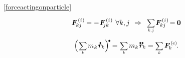 \vspace{-0.2em}
~\eqref{forceactingonparticle}

\nopagebreak\vspace{-0.3em}
\begin{equation}\label{actionreactionprinciple.fordiscretepoints}
\bm{F}^{\smthinternal}_{\hspace{-0.16ex}kj} = - \hspace{.12ex} \bm{F}^{\smthinternal}_{\hspace{-0.4ex}jk}
\hspace{.44em} \forall k,j
\hspace{.4em} \Rightarrow \hspace{.5em}
\scalebox{.8}{$ \displaystyle \sum_{\smash{k,\hspace{.1ex}j}} $} \hspace{.2ex}
\bm{F}^{\smthinternal}_{\hspace{-0.16ex}kj} \hspace{-0.2ex}
= \hspace{-0.1ex} \zerovector
\end{equation}


\vspace{-0.8em}\noindent
{}

\nopagebreak\vspace{-0.3em}
\begin{equation}\label{balanceoftranslationalmomentum.discretepoints}
\Bigl( \hspace{.2ex}
\scalebox{.8}{$ \displaystyle \sum_{\smash{k}} $} \hspace{.3ex} m_k \hspace{.2ex} \mathdotabove{\locationvector}_{\hspace{-0.1ex}k}
\Bigr)^{\hspace{-0.1em}\tikz[baseline=-0.2ex]\draw[black, fill=black] (0,0) circle (.28ex);} \hspace{-0.15ex}
= \hspace{.1ex} \scalebox{.8}{$ \displaystyle \sum_{\smash{k}} $} \hspace{.3ex} m_k \hspace{.2ex} \mathdotdotabove{\locationvector}_{\hspace{-0.1ex}k}
= \scalebox{.8}{$ \displaystyle \sum_{\smash{k}} $} \hspace{.3ex} \bm{F}^{\smthexternal}_{\hspace{-0.16ex}k}
\hspace{-0.1ex} .
\end{equation}

